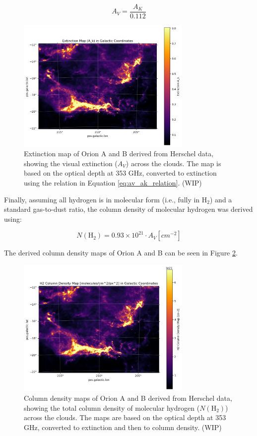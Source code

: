 \begin{equation}
    A_V = \frac{A_K}{0.112}
    \label{eq:av_ak_relation}
\end{equation}

\begin{figure}
    \centering
    \includegraphics[width=0.75\textwidth]{figures/extinction_map.png}
    \caption{Extinction map of Orion A and B derived from Herschel data, showing the visual extinction ($A_V$) across the clouds. The map is based on the optical depth at 353 GHz, converted to extinction using the relation in Equation \ref{eq:av_ak_relation}. (WIP)}
    \label{fig:extinction_map}
\end{figure}

Finally, assuming all hydrogen is in molecular form (i.e., fully in H$_2$) and a standard gas-to-dust ratio, the column density of molecular hydrogen was derived using:

\begin{equation}
    N(\mathrm{H_2}) = 0.93 \times 10^{21} \cdot A_V [cm^{-2}]
    \label{eq:n_h2_av_relation}
\end{equation}

The derived column density maps of Orion A and B can be seen in Figure \ref{fig:n_h2_final_map}.

\begin{figure}[t]
    \centering
    \includegraphics[width=0.75\textwidth]{figures/column_density_map.png}
    \caption{Column density maps of Orion A and B derived from Herschel data, showing the total column density of molecular hydrogen ($N(\mathrm{H}_2)$) across the clouds. The maps are based on the optical depth at 353 GHz, converted to extinction and then to column density. (WIP)}
    \label{fig:n_h2_final_map}
\end{figure}

